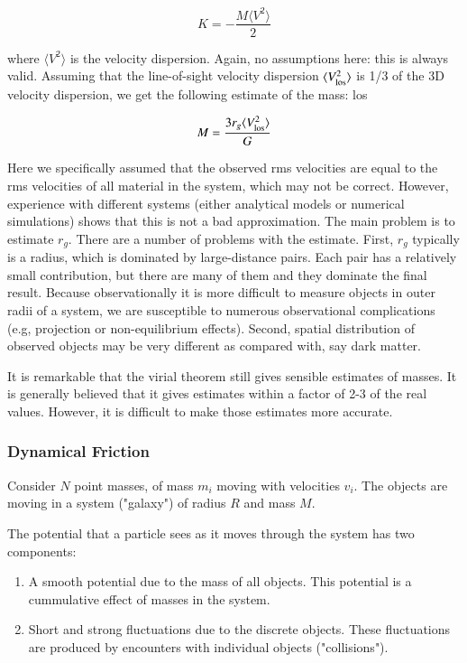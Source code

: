 \begin{equation}
K = -\frac{M\langle V^2\rangle}{2}
\end{equation}

where $\langle V^2\rangle$ is the velocity dispersion. Again, no assumptions here: this is always valid. Assuming that the line-of-sight velocity dispersion $\langle V^2_{\rm los}\rangle$ is 1/3 of the 3D velocity dispersion, we get the following estimate of the mass:
los

\begin{equation}
M = \frac{3r_g \langle V^2_{\rm los}\rangle }{G}
\end{equation}
 
Here we specifically assumed that the observed rms velocities are equal to the rms velocities of all material in the system, which may not be correct. However, experience with different systems (either analytical models or numerical simulations) shows that this is not a bad approximation. The main problem is to estimate $r_g$. There are a number of problems with the estimate. First, $r_g$ typically is a radius, which is dominated by large-distance pairs. Each pair has a relatively small contribution, but there are many of them and they dominate the final result. Because observationally it is more difficult to measure objects in outer radii of a system, we are susceptible to numerous observational complications (e.g, projection or non-equilibrium effects). Second, spatial distribution of observed objects may be very different as compared with, say dark matter.

It is remarkable that the virial theorem still gives sensible estimates of masses. It is generally believed that it gives estimates within a factor of 2-3 of the real values. However, it is difficult to make those estimates more accurate.

\subsubsection{Dynamical Friction}

Consider $N$ point masses, of mass $m_i$ moving with velocities $v_i$. The objects are moving in a system ("galaxy") of radius $R$ and mass $M$. 

The potential that a particle sees as it moves through the system has two components: 

\begin{enumerate}
\item A smooth potential due to the mass of all objects. This potential is a cummulative effect of masses in the system. 
\item Short and strong fluctuations due to the discrete objects. These fluctuations are produced by encounters with individual objects ("collisions").  
\end{enumerate}

